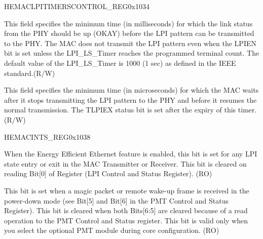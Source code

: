 \begin{register}{H}{EMACLPITIMERSCONTROL\_REG}{0x1034}\label{regdesc:EMACLPITIMERSCONTROLREG}
%
%
%
\regnewline%
\begin{regdesc}\begin{reglist}
\item [LPI\_LS\_TIMER] This field specifies the minimum time (in milliseconds) for which the link status from the PHY should be up (OKAY) before the LPI pattern can be transmitted to the PHY. The MAC does not transmit the LPI pattern even when the LPIEN bit is set unless the LPI\_LS\_Timer reaches the programmed terminal count. The default value of the LPI\_LS\_Timer is 1000 (1 sec) as defined in the IEEE standard.(R/W)
\item [LPI\_TW\_TIMER] This field specifies the minimum time (in microseconds) for which the MAC waits  after it stops transmitting the LPI pattern to the PHY and before it resumes the normal transmission. The TLPIEX status bit is set after the expiry of this timer.(R/W)
\end{reglist}\end{regdesc}
\end{register}


\begin{register}{H}{EMACINTS\_REG}{0x1038}\label{regdesc:EMACINTSREG}
%
%
%
%
%
%
\regnewline%
\begin{regdesc}\begin{reglist}
\item [LPIINTS]When the Energy Efficient Ethernet feature is enabled, this bit is set for any LPI state entry or exit in the MAC Transmitter or Receiver. This bit is cleared on reading Bit[0] of Register (LPI Control and Status Register). (RO)
\item [PMTINTS]This bit is set when a magic packet or remote wake-up frame is received in the power-down mode (see Bit[5] and Bit[6] in the PMT Control and Status Register). This bit is cleared when both Bits[6:5] are cleared because of a read operation to the PMT Control and Status register. This bit is valid only when you select the optional PMT module during core configuration. (RO)
\end{reglist}\end{regdesc}
\end{register}


